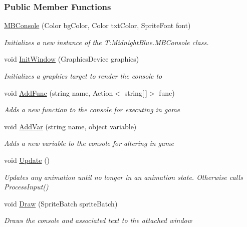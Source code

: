 \subsubsection*{Public Member Functions}
\begin{DoxyCompactItemize}
\item 
\hyperlink{class_m_b2_d_1_1_m_b_console_a9d251b5f9babfcb08cc519d707c9b815}{M\+B\+Console} (Color bg\+Color, Color txt\+Color, Sprite\+Font font)
\begin{DoxyCompactList}\small\item\em Initializes a new instance of the T\+:\+Midnight\+Blue.\+M\+B\+Console class. \end{DoxyCompactList}\item 
void \hyperlink{class_m_b2_d_1_1_m_b_console_a745ef1f55523b29b83d4d94c1fe5400b}{Init\+Window} (Graphics\+Device graphics)
\begin{DoxyCompactList}\small\item\em Initializes a graphics target to render the console to \end{DoxyCompactList}\item 
void \hyperlink{class_m_b2_d_1_1_m_b_console_a3c515ad4a199b0b67049df57fce7cb3f}{Add\+Func} (string name, Action$<$ string\mbox{[}$\,$\mbox{]}$>$ func)
\begin{DoxyCompactList}\small\item\em Adds a new function to the console for executing in game \end{DoxyCompactList}\item 
void \hyperlink{class_m_b2_d_1_1_m_b_console_aeff7888e763a415aeccadc347e09828d}{Add\+Var} (string name, object variable)
\begin{DoxyCompactList}\small\item\em Adds a new variable to the console for altering in game \end{DoxyCompactList}\item 
void \hyperlink{class_m_b2_d_1_1_m_b_console_a4239aee536dc49bbbd59d81d79f24266}{Update} ()
\begin{DoxyCompactList}\small\item\em Updates any animation until no longer in an animation state. Otherwise calls Process\+Input() \end{DoxyCompactList}\item 
void \hyperlink{class_m_b2_d_1_1_m_b_console_ab737469f6fe24b287f7979f788adb8c9}{Draw} (Sprite\+Batch sprite\+Batch)
\begin{DoxyCompactList}\small\item\em Draws the console and associated text to the attached window \end{DoxyCompactList}\item 

\end{DoxyCompactItemize}
